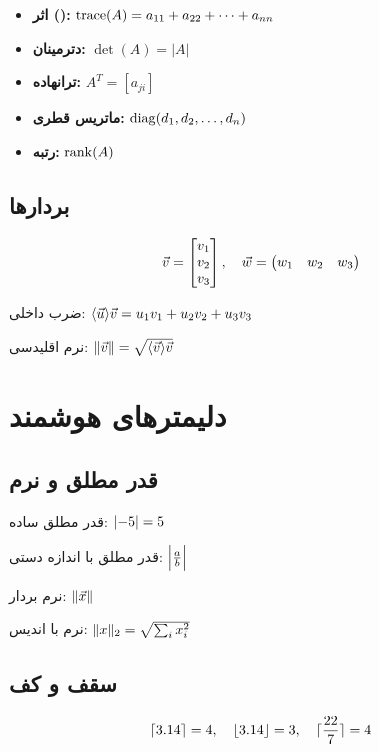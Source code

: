 \documentclass{matinbook}
\begin{document}
    \begin{itemize}
        \item \textbf{اثر ():}
        $\trace(A) = a_{11} + a_{22} + \cdots + a_{nn}$
        \item \textbf{دترمینان:} $\det(A) = |A|$
        \item \textbf{ترانهاده:} $A^{T} = [a_{ji}]$
        \item \textbf{ماتریس قطری:}
        $\diag(d_{1}, d_{2}, \ldots, d_{n})$
        \item \textbf{رتبه:} $\rank(A)$
    \end{itemize}
    
    \section{بردارها}
    
    \[
    \vec{v} = \mat{v_{1} \\ v_{2} \\ v_{3}}, \quad
    \vec{w} = \pmat{w_{1} & w_{2} & w_{3}}
    \]
    
    ضرب داخلی: $\inner{\vec{u}}{\vec{v}} = u_{1}v_{1} + u_{2}v_{2} + u_{3}v_{3}$
    
    نرم اقلیدسی: $\norm{\vec{v}} = \sqrt{\inner{\vec{v}}{\vec{v}}}$
    
    \chapter{دلیمترهای هوشمند}
    
    \section{قدر مطلق و نرم}
    
    قدر مطلق ساده: $\abs{-5} = 5$
    
    قدر مطلق با اندازه دستی: $\abs[\Big]{\frac{a}{b}}$
    
    نرم بردار: $\norm{\vec{x}}$
    
    نرم با اندیس: $\norm{x}_{2} = \sqrt{\sum_{i} x_{i}^{2}}$
    
    \section{سقف و کف}
    
    \[
    \ceil{3.14} = 4, \quad
    \floor{3.14} = 3, \quad
    \ceil[Big]{\frac{22}{7}} = 4
    \]
    
\end{document}
